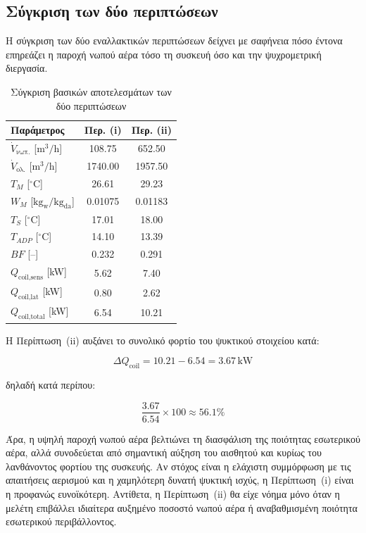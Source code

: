 \documentclass[12pt,a4paper]{article}
\begin{document}
\subsection{Σύγκριση των δύο περιπτώσεων}

Η σύγκριση των δύο εναλλακτικών περιπτώσεων δείχνει με σαφήνεια πόσο έντονα
επηρεάζει η παροχή νωπού αέρα τόσο τη συσκευή όσο και την ψυχρομετρική διεργασία.

\begin{table}[H]
\centering
\small
\caption{Σύγκριση βασικών αποτελεσμάτων των δύο περιπτώσεων}
\begin{tabular}{lcc}
\toprule
\textbf{Παράμετρος} & \textbf{Περ. (i)} & \textbf{Περ. (ii)} \\
\midrule
\(\dot V_{\text{νωπ.}}\) [\(\mathrm{m^3/h}\)] & 108.75 & 652.50 \\
\(\dot V_{\text{ολ.}}\) [\(\mathrm{m^3/h}\)] & 1740.00 & 1957.50 \\
\(T_M\) [\(^\circ\mathrm{C}\)] & 26.61 & 29.23 \\
\(W_M\) [\(\mathrm{kg_w/kg_{da}}\)] & 0.01075 & 0.01183 \\
\(T_S\) [\(^\circ\mathrm{C}\)] & 17.01 & 18.00 \\
\(T_{ADP}\) [\(^\circ\mathrm{C}\)] & 14.10 & 13.39 \\
\(BF\) [--] & 0.232 & 0.291 \\
\(Q_{\text{coil,sens}}\) [kW] & 5.62 & 7.40 \\
\(Q_{\text{coil,lat}}\) [kW] & 0.80 & 2.62 \\
\(Q_{\text{coil,total}}\) [kW] & 6.54 & 10.21 \\
\bottomrule
\end{tabular}
\end{table}

Η Περίπτωση~(ii) αυξάνει το συνολικό φορτίο του ψυκτικού στοιχείου κατά:

\[
\Delta Q_{\text{coil}} = 10.21 - 6.54 = 3.67\,\mathrm{kW}
\]

δηλαδή κατά περίπου:

\[
\frac{3.67}{6.54} \times 100 \approx 56.1\%
\]

Άρα, η υψηλή παροχή νωπού αέρα βελτιώνει τη διασφάλιση της ποιότητας εσωτερικού
αέρα, αλλά συνοδεύεται από σημαντική αύξηση του αισθητού και κυρίως του
λανθάνοντος φορτίου της συσκευής. Αν στόχος είναι η ελάχιστη συμμόρφωση με τις
απαιτήσεις αερισμού και η χαμηλότερη δυνατή ψυκτική ισχύς, η Περίπτωση~(i) είναι
η προφανώς ευνοϊκότερη. Αντίθετα, η Περίπτωση~(ii) θα είχε νόημα μόνο όταν η
μελέτη επιβάλλει ιδιαίτερα αυξημένο ποσοστό νωπού αέρα ή αναβαθμισμένη ποιότητα
εσωτερικού περιβάλλοντος.
\end{document}
